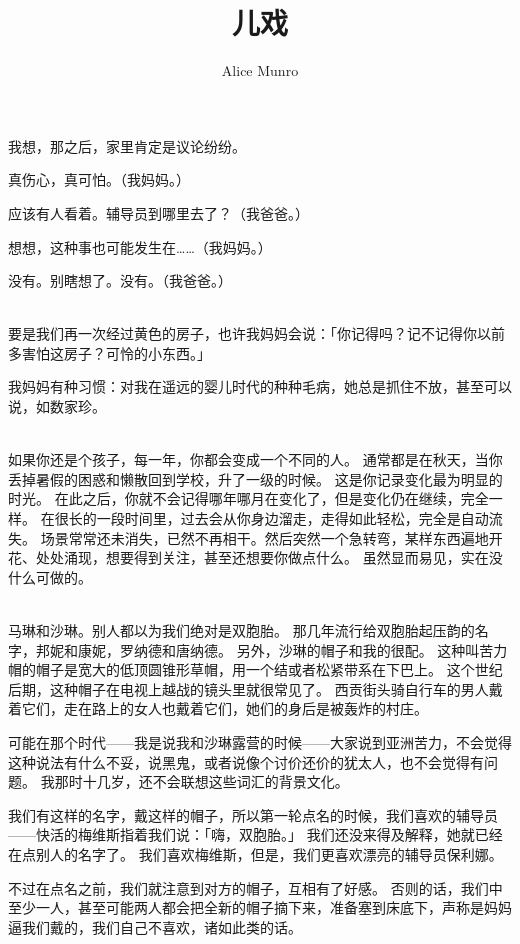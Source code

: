 \documentclass[UTF8]{ctexart}
\title{儿戏}
\author{Alice Munro}
\date{}
\begin{document}
\maketitle

\newpage

我想，那之后，家里肯定是议论纷纷。

真伤心，真可怕。（我妈妈。）

应该有人看着。辅导员到哪里去了？（我爸爸。）

想想，这种事也可能发生在……（我妈妈。）

没有。别瞎想了。没有。（我爸爸。）

~\\

要是我们再一次经过黄色的房子，也许我妈妈会说：「你记得吗？记不记得你以前多害怕这房子？可怜的小东西。」

我妈妈有种习惯：对我在遥远的婴儿时代的种种毛病，她总是抓住不放，甚至可以说，如数家珍。

~\\

如果你还是个孩子，每一年，你都会变成一个不同的人。
通常都是在秋天，当你丢掉暑假的困惑和懒散回到学校，升了一级的时候。
这是你记录变化最为明显的时光。
在此之后，你就不会记得哪年哪月在变化了，但是变化仍在继续，完全一样。
在很长的一段时间里，过去会从你身边溜走，走得如此轻松，完全是自动流失。
场景常常还未消失，已然不再相干。然后突然一个急转弯，某样东西遍地开花、处处涌现，想要得到关注，甚至还想要你做点什么。
虽然显而易见，实在没什么可做的。

~\\

马琳和沙琳。别人都以为我们绝对是双胞胎。
那几年流行给双胞胎起压韵的名字，邦妮和康妮，罗纳德和唐纳德。
另外，沙琳的帽子和我的很配。
这种叫苦力帽的帽子是宽大的低顶圆锥形草帽，用一个结或者松紧带系在下巴上。
这个世纪后期，这种帽子在电视上越战的镜头里就很常见了。
西贡街头骑自行车的男人戴着它们，走在路上的女人也戴着它们，她们的身后是被轰炸的村庄。

可能在那个时代——我是说我和沙琳露营的时候——大家说到亚洲苦力，不会觉得这种说法有什么不妥，说黑鬼，或者说像个讨价还价的犹太人，也不会觉得有问题。
我那时十几岁，还不会联想这些词汇的背景文化。

我们有这样的名字，戴这样的帽子，所以第一轮点名的时候，我们喜欢的辅导员——快活的梅维斯指着我们说：「嗨，双胞胎。」
我们还没来得及解释，她就已经在点别人的名字了。
我们喜欢梅维斯，但是，我们更喜欢漂亮的辅导员保利娜。

不过在点名之前，我们就注意到对方的帽子，互相有了好感。
否则的话，我们中至少一人，甚至可能两人都会把全新的帽子摘下来，准备塞到床底下，声称是妈妈逼我们戴的，我们自己不喜欢，诸如此类的话。
\end{document}
